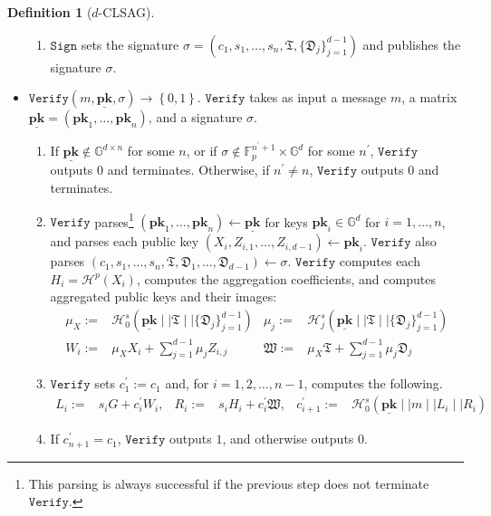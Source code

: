 \documentclass{mrl}
\theoremstyle{plain}
\theoremstyle{definition}
\newtheorem{definition}{Definition}[section]
\begin{document}
\begin{definition}[$d$-CLSAG]
\begin{itemize}
\begin{enumerate}
\item $\texttt{Sign}$ sets the signature $\sigma = (c_1, s_1, \ldots, s_n, \mathfrak{T}, \{\mathfrak{D}_j\}_{j=1}^{d-1})$ and publishes the signature $\sigma$.
\end{enumerate}

\item $\texttt{Verify}\left(m, \underline{\textbf{pk}}, \sigma\right) \to \left\{0,1\right\}$. $\texttt{Verify}$ takes as input a message $m$, a matrix $\underline{\textbf{pk}} = (\textbf{pk}_1, \ldots, \textbf{pk}_n)$, and a signature $\sigma$.

\begin{enumerate}
\item If $\underline{\textbf{pk}} \notin \mathbb{G}^{d \times n}$ for some $n$, or if $\sigma \notin \mathbb{F}_p^{n^\prime+1} \times \mathbb{G}^d$ for some $n^\prime$, $\texttt{Verify}$ outputs $0$ and terminates. Otherwise, if $n^\prime \neq n$, $\texttt{Verify}$ outputs $0$ and terminates.

\item $\texttt{Verify}$ parses\footnote{This parsing is always successful if the previous step does not terminate $\texttt{Verify}$.} $(\textbf{pk}_1, \ldots, \textbf{pk}_n) \leftarrow \underline{\textbf{pk}}$ for keys $\textbf{pk}_i \in \mathbb{G}^d$ for $i=1, \ldots, n$, and parses each public key $(X_i, Z_{i, 1}, \ldots, Z_{i, d-1}) \leftarrow \textbf{pk}_i$.  $\texttt{Verify}$ also parses $(c_1, s_1, \ldots, s_n, \mathfrak{T}, \mathfrak{D}_1, \ldots, \mathfrak{D}_{d - 1}) \leftarrow \sigma$. $\texttt{Verify}$ computes each $H_i = \mathcal{H}^p(X_i)$, computes the aggregation coefficients, and computes aggregated public keys and their images:
\begin{align*}
\mu_X := & \mathcal{H}^s_0(\underline{\textbf{pk}} \mid \mid \mathfrak{T} \mid \mid \{\mathfrak{D}_j\}_{j=1}^{d-1}) & \mu_j := & \mathcal{H}^s_j(\underline{\textbf{pk}} \mid \mid \mathfrak{T} \mid \mid \{\mathfrak{D}_j\}_{j=1}^{d-1})\\
W_i :=& \mu_X X_i + \sum_{j=1}^{d-1} \mu_j Z_{i,j} & \mathfrak{W} :=& \mu_X \mathfrak{T} + \sum_{j=1}^{d-1} \mu_j \mathfrak{D}_j 
\end{align*}

\item $\texttt{Verify}$ sets $c_1^\prime := c_1$ and, for $i=1, 2, \ldots, n-1$, computes the following.
\begin{align*}
L_i :=& s_i G + c_i^\prime W_i, &
R_i :=& s_i H_i + c_i^\prime\mathfrak{W}, &
c_{i+1}^\prime :=& \mathcal{H}^s_0\left(\underline{\textbf{pk}} \mid \mid m \mid \mid L_i \mid \mid R_i\right)
\end{align*}
\item If $c_{n+1}^\prime = c_1$, $\texttt{Verify}$ outputs $1$, and otherwise outputs $0$.
\end{enumerate}


\end{itemize}
\end{definition}
\end{document}
